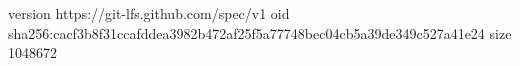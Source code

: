 version https://git-lfs.github.com/spec/v1
oid sha256:cacf3b8f31ccafddea3982b472af25f5a77748bec04cb5a39de349c527a41e24
size 1048672

